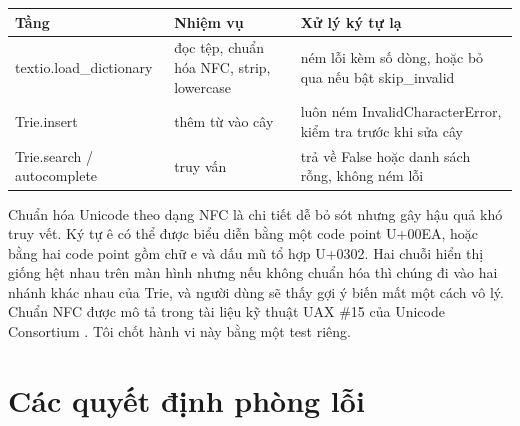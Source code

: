 \begin{center}
\end{center}

{\footnotesize\singlespacing
\begin{longtable}[]{@{}
  >{\raggedright\arraybackslash}p{}
  >{\raggedright\arraybackslash}p{}
  >{\raggedright\arraybackslash}p{}@{}}
\toprule\noalign{}
\begin{minipage}[b]{\linewidth}\raggedright
Tầng
\end{minipage} & \begin{minipage}[b]{\linewidth}\raggedright
Nhiệm vụ
\end{minipage} & \begin{minipage}[b]{\linewidth}\raggedright
Xử lý ký tự lạ
\end{minipage} \\
\midrule\noalign{}
\endhead
\bottomrule\noalign{}
\endlastfoot
textio.load\_dictionary & đọc tệp, chuẩn hóa NFC, strip, lowercase & ném
lỗi kèm số dòng, hoặc bỏ qua nếu bật skip\_invalid \\
Trie.insert & thêm từ vào cây & luôn ném InvalidCharacterError, kiểm tra
trước khi sửa cây \\
Trie.search / autocomplete & truy vấn & trả về False hoặc danh sách
rỗng, không ném lỗi \\
\end{longtable}
}

Chuẩn hóa Unicode theo dạng NFC là chi tiết dễ bỏ sót nhưng gây hậu quả
khó truy vết. Ký tự ê có thể được biểu diễn bằng một code point U+00EA,
hoặc bằng hai code point gồm chữ e và dấu mũ tổ hợp U+0302. Hai chuỗi
hiển thị giống hệt nhau trên màn hình nhưng nếu không chuẩn hóa thì
chúng đi vào hai nhánh khác nhau của Trie, và người dùng sẽ thấy gợi ý
biến mất một cách vô lý. Chuẩn NFC được mô tả trong tài liệu kỹ thuật
UAX \#15 của Unicode Consortium \cite{unicode15}. Tôi chốt hành vi này bằng một
test riêng.

\section{Các quyết định phòng lỗi}
\label{sec:5-4}

